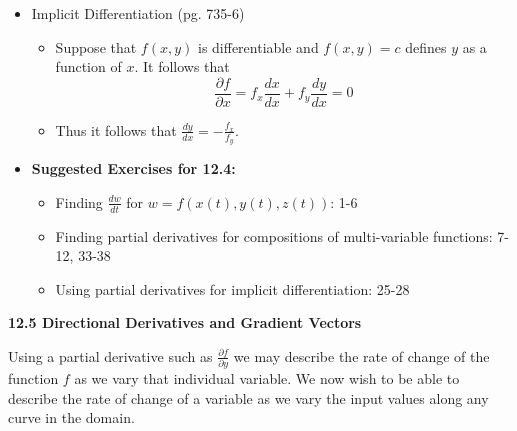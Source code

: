 \documentclass[12pt]{article}
\theoremstyle{plain}
\theoremstyle{definition}
\theoremstyle{remark}
\newcommand{\ds}{\displaystyle}
\begin{document}
\begin{itemize}
	\newpage
		
	\item Implicit Differentiation (pg. 735-6)
	
		\begin{itemize}
		\item Suppose that $f(x,y)$ is differentiable and $f(x,y)=c$ defines $y$ as a function of $x$. It follows that \[\frac{\partial f}{\partial x}=f_x\frac{dx}{dx}+f_y\frac{dy}{dx} = 0\]
		\item Thus it follows that $\ds\frac{dy}{dx} = -\frac{f_x}{f_y}$.
		\end{itemize}
		
	\item \textbf{Suggested Exercises for 12.4:}
	
		\begin{itemize}
		\item Finding $\frac{dw}{dt}$ for $w=f(x(t),y(t),z(t))$: 1-6
		\item Finding partial derivatives for compositions of multi-variable functions: 7-12, 33-38
		\item Using partial derivatives for implicit differentiation: 25-28
		\end{itemize}
	
	\end{itemize}
	
	\newpage
	
	\centerline{\bf 12.5 Directional Derivatives and Gradient Vectors}
	
	Using a partial derivative such as $\frac{\partial f}{\partial y}$ we may describe the rate of change of the function $f$ as we vary that individual variable. We now wish to be able to describe the rate of change of a variable as we vary the input values along any curve in the domain.
	
\end{document}
